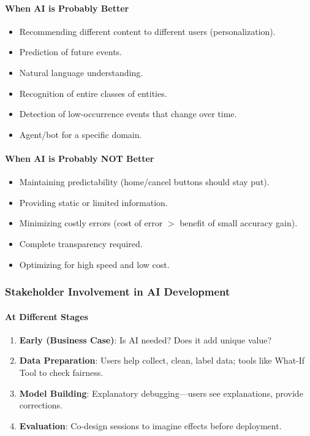 \paragraph*{When AI is Probably Better}
\begin{itemize}
  \item Recommending different content to different users (personalization).
  \item Prediction of future events.
  \item Natural language understanding.
  \item Recognition of entire classes of entities.
  \item Detection of low-occurrence events that change over time.
  \item Agent/bot for a specific domain.
\end{itemize}

\paragraph*{When AI is Probably NOT Better}
\begin{itemize}
  \item Maintaining predictability (home/cancel buttons should stay put).
  \item Providing static or limited information.
  \item Minimizing costly errors (cost of error $>$ benefit of small accuracy gain).
  \item Complete transparency required.
  \item Optimizing for high speed and low cost.
\end{itemize}

\subsubsection*{Stakeholder Involvement in AI Development}

\paragraph*{At Different Stages}

\begin{enumerate}
  \item \textbf{Early (Business Case)}: Is AI needed? Does it add unique value?
  \item \textbf{Data Preparation}: Users help collect, clean, label data; tools like What-If Tool to check fairness.
  \item \textbf{Model Building}: Explanatory debugging---users see explanations, provide corrections.
  \item \textbf{Evaluation}: Co-design sessions to imagine effects before deployment.
\end{enumerate}


